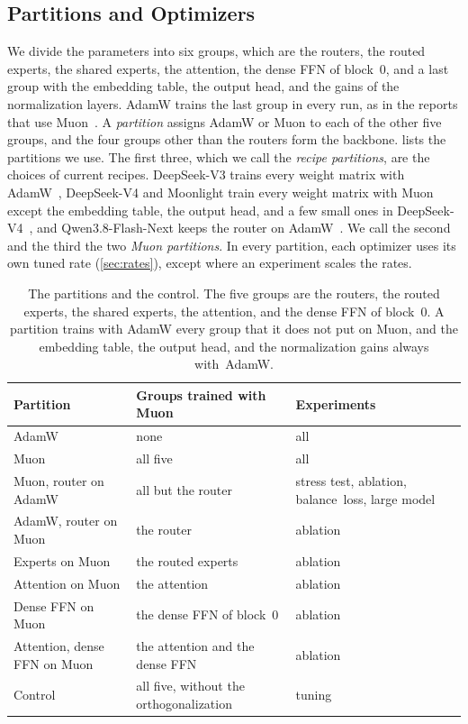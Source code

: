 \documentclass[11pt, a4paper]{article}
\begin{document}
\subsection{Partitions and Optimizers}
\label{sec:partitions}

We divide the parameters into six groups, which are the routers, the routed experts, the shared experts, the attention, the dense FFN of block~0, and a last group with the embedding table, the output head, and the gains of the normalization layers. AdamW trains the last group in every run, as in the reports that use Muon~\citep{jordan2024muon, liu2025moonlight, deepseek2026v4}. A \emph{partition} assigns AdamW or Muon to each of the other five groups, and the four groups other than the routers form the backbone.  lists the partitions we use. The first three, which we call the \emph{recipe partitions}, are the choices of current recipes. DeepSeek-V3 trains every weight matrix with AdamW~\citep{deepseek2024v3}, DeepSeek-V4 and Moonlight train every weight matrix with Muon except the embedding table, the output head, and a few small ones in DeepSeek-V4~\citep{deepseek2026v4, liu2025moonlight}, and Qwen3.8-Flash-Next keeps the router on AdamW~\citep{qiu2026qwennext}. We call the second and the third the two \emph{Muon partitions}. In every partition, each optimizer uses its own tuned rate (\cref{sec:rates}), except where an experiment scales the rates.

\begin{table}[t]
  \centering
  \caption{The partitions and the control. The five groups are the routers, the routed experts, the shared experts, the attention, and the dense FFN of block~0. A partition trains with AdamW every group that it does not put on Muon, and the embedding table, the output head, and the normalization gains always with~AdamW.}
  \label{tab:partitions}
  \small
  \begin{tabular}{@{}ll>{\raggedright\arraybackslash}p{4.3cm}@{}}
    \toprule
    Partition & Groups trained with Muon & Experiments \\
    \midrule
    AdamW & none & all \\
    Muon & all five & all \\
    Muon, router on AdamW & all but the router & stress test, ablation, balance~loss, large model \\
    AdamW, router on Muon & the router & ablation \\
    Experts on Muon & the routed experts & ablation \\
    Attention on Muon & the attention & ablation \\
    Dense FFN on Muon & the dense FFN of block~0 & ablation \\
    Attention, dense FFN on Muon & the attention and the dense FFN & ablation \\
    Control & all five, without the orthogonalization & tuning \\
    \bottomrule
  \end{tabular}
\end{table}
\end{document}
